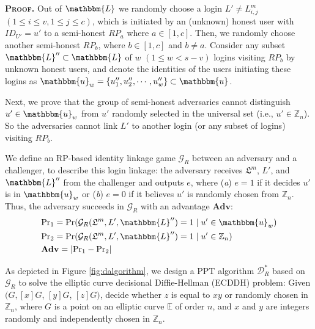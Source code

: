 \noindent\textbf{\textsc{Proof.}} Out of $\mathbbm{L}$
 we randomly choose a login $L' \neq L^m_{i,j}$ $(1 \le i \le v, 1 \le j \le c)$,
 which is initiated by an (unknown) honest user with $ID_{U'}=u'$ to a semi-honest $RP_{a}$ where $a \in [1,c]$.
Then, we randomly choose another semi-honest $RP_{b}$, where $b \in [1,c]$ and $b \neq a$.
Consider any subset $\mathbbm{L}'' \subset \mathbbm{L}$ of $w$ $(1 \leq w < s-v)$ logins visiting $RP_{b}$ by unknown honest users,
 and denote the identities of the users initiating these logins as $\mathbbm{u}_w=\{{u''_1}, {u''_2}, \cdots, {u''_w}\} \subset \mathbbm{u}$.

Next, we prove that the group of semi-honest adversaries cannot distinguish $u' \in \mathbbm{u}_w$ from $u'$ randomly selected in the universal set (i.e., $u' \in \mathbb{Z}_n$).
So the adversaries cannot link $L'$ to another login (or any subset of logins) visiting $RP_{b}$.


We define an RP-based identity linkage game $\mathcal{G}_R$ between an adversary and a challenger, to describe this login linkage: the adversary receives $\mathfrak{L}^m$, $L'$, and $\mathbbm{L}''$ from the challenger and outputs $e$, where (\emph{a}) $e = 1$ if it decides $u'$ is in $\mathbbm{u}_w$ %
or (\emph{b}) $e=0$ if it believes $u'$ is randomly chosen from $\mathbb{Z}_n$.
Thus, the adversary succeeds in $\mathcal{G}_R$ with an advantage $\mathbf{Adv}$:
\begin{align*}
&{\rm Pr}_1={\rm Pr}(\mathcal{G}_R(\mathfrak{L}^m, L', \mathbbm{L}'')=1 \;| \; u' \in \mathbbm{u}_w)  \\
&{\rm Pr}_2={\rm Pr}(\mathcal{G}_R(\mathfrak{L}^m, L', \mathbbm{L}'')=1 \; | \; u' \in \mathbb{Z}_n)\\
&{\mathbf{Adv}}=|{\rm Pr}_1-{\rm Pr}_2|
\end{align*}

As depicted in Figure \ref{fig:dalgorithm}, we design a PPT algorithm $\mathcal{D}^*_R$ based on $\mathcal{G}_R$ to solve the elliptic curve decisional Diffie-Hellman (ECDDH) problem: Given $(G, [x]G$, $[y]G$, $[z]G)$, decide whether $z$ is equal to $xy$ or randomly chosen in $\mathbb{Z}_n$, where $G$ is a point on an elliptic curve $\mathbb{E}$ of order $n$, and $x$ and $y$ are integers randomly and independently chosen in $\mathbb{Z}_n$.


